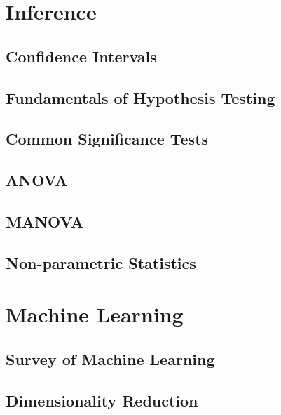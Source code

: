 \documentclass[12pt]{book}
\theoremstyle{definition}
\begin{document}
\part{Inference}

\chapter{Confidence Intervals}


\chapter{Fundamentals of Hypothesis Testing}


\chapter{Common Significance Tests}


\chapter{ANOVA}


\chapter{MANOVA}


\chapter{Non-parametric Statistics}


\part{Machine Learning}

\chapter{Survey of Machine Learning}


\chapter{Dimensionality Reduction}

\end{document}

